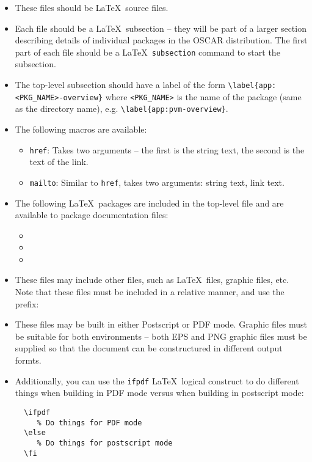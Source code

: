 \begin{itemize}
\item These files should be \LaTeX\ source files.

\item Each file should be a \LaTeX\ subsection -- they will be part of
  a larger section describing details of individual packages in the
  OSCAR distribution.  The first part of each file should be a \LaTeX\
  {\tt subsection} command to start the subsection.

\item The top-level subsection should have a label of the form
      \verb=\label{app:<PKG_NAME>-overview}= where \verb=<PKG_NAME>= is
      the name of the package (same as the directory name), e.g.
         \verb=\label{app:pvm-overview}=.

\item The following macros are available:

  \begin{itemize}
  \item {\tt href}: Takes two arguments -- the first is the string
    text, the second is the text of the link.

  \item {\tt mailto}: Similar to {\tt href}, takes two arguments:
    string text, link text.
  \end{itemize}

\item The following \LaTeX\ packages are included in the top-level
  file and are available to package documentation files:

  \begin{itemize}
  \item {}
  \item {}
  \item {}
  \end{itemize}

\item These files may include other files, such as \LaTeX\ files,
  graphic files, etc.  Note that these files must be included in a
  relative manner, and use the prefix: 

  \vspace{10pt}
  \centerline{}
  
\item These files may be built in either Postscript or PDF mode.
  Graphic files must be suitable for both environments -- both EPS and
  PNG graphic files must be supplied so that the document can be
  constructured in different output formts.
  
\item Additionally, you can use the {\tt ifpdf} \LaTeX\ logical
  construct to do different things when building in PDF mode versus
  when building in postscript mode:

\begin{verbatim}
  \ifpdf
     % Do things for PDF mode
  \else
     % Do things for postscript mode
  \fi
\end{verbatim}

\end{itemize}

